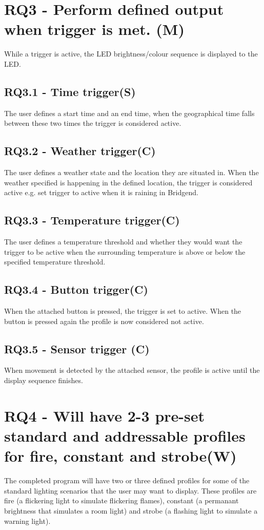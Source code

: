 \section {RQ3 - Perform defined output when trigger is met. (M)}
While a trigger is active, the LED brightness/colour sequence is displayed to the LED.

\subsection {RQ3.1 - Time trigger(S)}
The user defines a start time and an end time, when the geographical time falls between these two times the trigger is considered active. 

\subsection {RQ3.2 - Weather trigger(C)}
The user defines a weather state and the location they are situated in. When the weather specified is happening in the defined location, the trigger is considered active e.g. set trigger to active when it is raining in Bridgend.

\subsection {RQ3.3 - Temperature trigger(C)}
The user defines a temperature threshold and whether they would want the trigger to be active when the surrounding temperature is above or below the specified temperature threshold. 

\subsection {RQ3.4 - Button trigger(C)}
When the attached button is pressed, the trigger is set to active. When the button is pressed again the profile is now considered not active.

\subsection {RQ3.5 - Sensor trigger (C)}
When movement is detected by the attached sensor, the profile is active until the display sequence finishes.

\section {RQ4 - Will have 2-3 pre-set standard and addressable profiles for fire, constant and strobe(W)}
The completed program will have two or three defined profiles for some of the standard lighting scenarios that the user may want to display. These profiles are fire (a flickering light to simulate flickering flames), constant (a permanant brightness that simulates a room light) and strobe (a flashing light to simulate a warning light).

